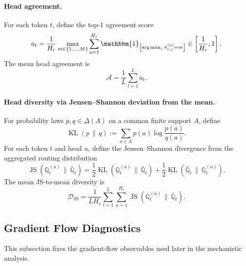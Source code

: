 \documentclass{article}
\theoremstyle{plain}
\theoremstyle{definition}
\theoremstyle{remark}
\begin{document}
\paragraph{Head agreement.}
For each token $t$, define the top-1 agreement score
\begin{equation}
\label{eq:head-agreement-token}
a_t
=
\frac{1}{H_r}
\max_{m\in\{1,\dots,M\}}
\sum_{u=1}^{H_r}
\mathbbm{1}_{\left[\arg\max_j \pi_{t,j}^{(u)}=m\right]}
\in\left[\frac{1}{H_r},1\right].
\end{equation}
The mean head agreement is
\begin{equation}
\label{eq:head-agreement}
\mathcal A
=
\frac{1}{L}\sum_{t=1}^L a_t.
\end{equation}

\paragraph{Head diversity via Jensen--Shannon deviation from the mean.}
For probability laws $p,q\in\Delta(A)$ on a common finite support $A$, define
\[
\operatorname{KL}(p\,\|\,q)
:=
\sum_{a\in A} p(a)\log\frac{p(a)}{q(a)}.
\]
For each token $t$ and head $u$, define the Jensen--Shannon divergence from the aggregated routing distribution
\begin{equation}
\label{eq:js-divergence}
\operatorname{JS}(\mathbb Q_t^{(u)}\,\|\,\bar{\mathbb Q}_t)
=
\frac{1}{2}\operatorname{KL}(\mathbb Q_t^{(u)}\,\|\,\bar{\mathbb Q}_t)
+
\frac{1}{2}\operatorname{KL}(\bar{\mathbb Q}_t\,\|\,\mathbb Q_t^{(u)}).
\end{equation}
The mean JS-to-mean diversity is
\begin{equation}
\label{eq:js-diversity}
\mathcal D_{\mathrm{JS}}
=
\frac{1}{LH_r}
\sum_{t=1}^L\sum_{u=1}^{H_r}
\operatorname{JS}(\mathbb Q_t^{(u)}\,\|\,\bar{\mathbb Q}_t).
\end{equation}

\subsection{Gradient Flow Diagnostics}
\label{sec:gradient-flow-diagnostics}

This subsection fixes the gradient-flow observables used later in the mechanistic analysis.
\end{document}
